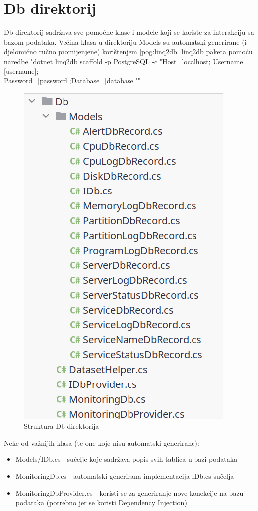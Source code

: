 \documentclass[zavrsnirad]{fer}
\begin{document}
\section{Db direktorij}
\label{pog:db_dir}
Db direktorij sadržava sve pomoćne klase i modele koji se koriste za interakciju sa bazom podataka. Većina klasa u direktoriju Models su automatski generirane (i djelomično ručno promijenjene) korištenjem \ref{pog:linq2db} linq2db paketa pomoću naredbe "dotnet linq2db scaffold -p PostgreSQL -c "Host=localhost; Username=[username];\\Password=[password];Database=[database]""

\begin{figure}[htb!]
	\centering
	\includegraphics[width=0.5\linewidth]{images/db_dir_structure.png} 
	\caption{Struktura Db direktorija}
	\label{slk:db_dir_structure}
\end{figure}

Neke od važnijih klasa (te one koje nisu automatski generirane):
\begin{itemize}
	\item Models/IDb.cs - sučelje koje sadržava popis svih tablica u bazi podataka
	
	\item MonitoringDb.cs - automatski generirana implementacija IDb.cs sučelja
	\item MonitoringDbProvider.cs - koristi se za generiranje nove konekcije na bazu podataka (potrebno jer se koristi Dependency Injection)
\end{itemize}
\end{document}
